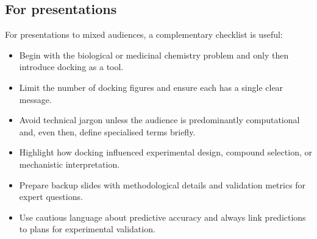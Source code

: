 \documentclass[12pt]{article}
\begin{document}
\subsection{For presentations}

For presentations to mixed audiences, a complementary checklist is useful:

\begin{itemize}
  \item Begin with the biological or medicinal chemistry problem and only then introduce docking as a tool.
  \item Limit the number of docking figures and ensure each has a single clear message.
  \item Avoid technical jargon unless the audience is predominantly computational and, even then, define specialised terms briefly.
  \item Highlight how docking influenced experimental design, compound selection, or mechanistic interpretation.
  \item Prepare backup slides with methodological details and validation metrics for expert questions.
  \item Use cautious language about predictive accuracy and always link predictions to plans for experimental validation.
\end{itemize}



\end{document}
